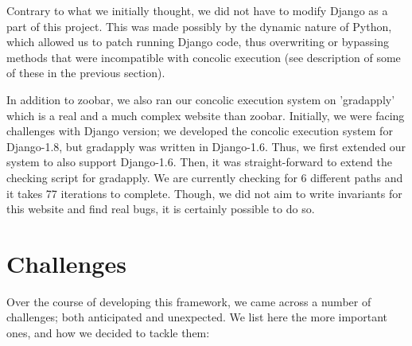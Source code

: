 \documentclass{scrartcl}
\begin{document}
Contrary to what we initially thought, we did not have to modify Django as a
part of this project. This was made possibly by the dynamic nature of Python,
which allowed us to patch running Django code, thus overwriting or bypassing
methods that were incompatible with concolic execution (see description of some
of these in the previous section).

In addition to zoobar, we also ran our concolic execution system on
'gradapply' which is a real and a much complex website than zoobar.
Initially, we were facing challenges with Django version; we developed
the concolic execution system for Django-1.8, but gradapply was written
in Django-1.6. Thus, we first extended our system to also support
Django-1.6. Then, it was straight-forward to extend the checking script
for gradapply. We are currently checking for 6 different paths and it takes
77 iterations to complete. Though, we did not aim to write invariants for
this website and find real bugs, it is certainly possible to do so.

\section{Challenges}
Over the course of developing this framework, we came across a number of
challenges; both anticipated and unexpected. We list here the more important
ones, and how we decided to tackle them:
\end{document}
